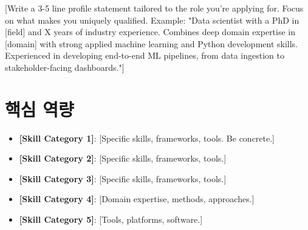 \documentclass[11pt,a4paper,sans]{moderncv}
\begin{document}
\makecvtitle


\vspace{6pt}
\small{[Write a 3-5 line profile statement tailored to the role you're applying for. Focus on what makes you uniquely qualified. Example: "Data scientist with a PhD in [field] and X years of industry experience. Combines deep domain expertise in [domain] with strong applied machine learning and Python development skills. Experienced in developing end-to-end ML pipelines, from data ingestion to stakeholder-facing dashboards."]}


\section{핵심 역량}
\vspace{1pt}
\begin{itemize}

\item \textbf{[Skill Category 1]}: [Specific skills, frameworks, tools. Be concrete.]

\item \textbf{[Skill Category 2]}: [Specific skills, frameworks, tools.]

\item \textbf{[Skill Category 3]}: [Specific skills, frameworks, tools.]

\item \textbf{[Skill Category 4]}: [Domain expertise, methods, approaches.]

\item \textbf{[Skill Category 5]}: [Tools, platforms, software.]

\end{itemize}

\end{document}
